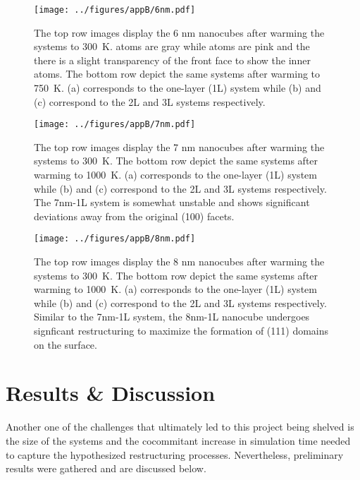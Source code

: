 \begin{landscape}
\begin{figure}[p!]
\centering
  \texttt{[image: ../figures/appB/6nm.pdf]}
  \caption{The top row images display the 6 nm nanocubes after warming the
systems to 300~K.  atoms are gray while  atoms are pink and the
there is a slight transparency of the front  face to show the inner
 atoms. The bottom row depict the same systems after warming to 750~K.
(a) corresponds to the one-layer (1L) system while (b) and (c) correspond to
the 2L and 3L systems respectively. }
  \label{fig:6nm}
\end{figure}
\end{landscape}

\begin{landscape}
\begin{figure}[p!]
\centering
  \texttt{[image: ../figures/appB/7nm.pdf]}
  \caption{The top row images display the 7 nm nanocubes after warming the
systems to 300~K.  The bottom row depict the same systems after warming to
1000~K.  (a) corresponds to the one-layer (1L) system while (b) and (c)
correspond to the 2L and 3L systems respectively. The 7nm-1L system is somewhat
unstable and shows significant deviations away from the original (100) facets.}
  \label{fig:7nm}
\end{figure}
\end{landscape}

\begin{landscape}
\begin{figure}[p!]
\centering
  \texttt{[image: ../figures/appB/8nm.pdf]}
  \caption{The top row images display the 8 nm nanocubes after warming the
systems to 300~K.  The bottom row depict the same systems after warming to
1000~K.  (a) corresponds to the one-layer (1L) system while (b) and (c)
correspond to the 2L and 3L systems respectively. Similar to the 7nm-1L system,
the 8nm-1L nanocube undergoes signficant restructuring to maximize the
formation of (111) domains on the surface. }
  \label{fig:8nm}
\end{figure}
\end{landscape}



\section{Results \& Discussion}
Another one of the challenges that ultimately led to this project being shelved
is the size of the systems and the cocommitant increase in simulation time
needed to capture the hypothesized restructuring processes. Nevertheless,
preliminary results were gathered and are discussed below.

